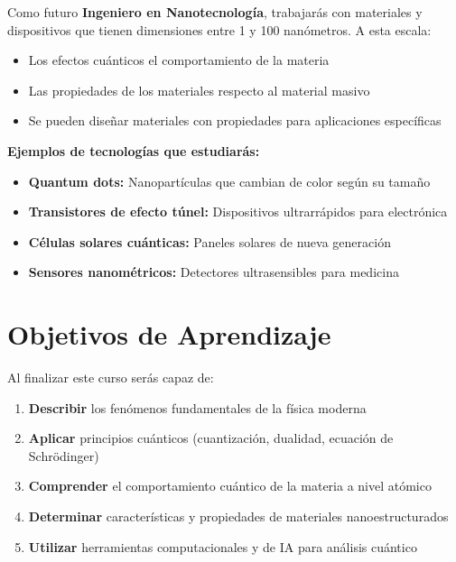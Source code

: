 \begin{tecnologiabox}
\begin{tecnologiabox}
\begin{tecnologiabox}
\begin{teknologiabox}
\begin{tecnologiabox}
\begin{tecnologiabox}
\begin{tecnologiabox}
Como futuro \textbf{Ingeniero en Nanotecnología}, trabajarás con materiales y dispositivos que tienen dimensiones entre 1 y 100 nanómetros. A esta escala:

\begin{itemize}
\item Los efectos cuánticos  el comportamiento de la materia
\item Las propiedades de los materiales  respecto al material masivo
\item Se pueden diseñar materiales con propiedades  para aplicaciones específicas
\end{itemize}

\begin{tecnologiabox}
\textbf{Ejemplos de tecnologías que estudiarás:}
\begin{itemize}
	\item \textbf{Quantum dots:} Nanopartículas que cambian de color según su tamaño
	\item \textbf{Transistores de efecto túnel:} Dispositivos ultrarrápidos para electrónica
	\item \textbf{Células solares cuánticas:} Paneles solares de nueva generación
	\item \textbf{Sensores nanométricos:} Detectores ultrasensibles para medicina
\end{itemize}
\end{tecnologiabox}

\section{Objetivos de Aprendizaje}

\begin{objetivobox}
Al finalizar este curso serás capaz de:

\begin{enumerate}
	\item \textbf{Describir} los fenómenos fundamentales de la física moderna
	\item \textbf{Aplicar} principios cuánticos (cuantización, dualidad, ecuación de Schrödinger)
	\item \textbf{Comprender} el comportamiento cuántico de la materia a nivel atómico
	\item \textbf{Determinar} características y propiedades de materiales nanoestructurados
	\item \textbf{Utilizar} herramientas computacionales y de IA para análisis cuántico
\end{enumerate}
\end{objetivobox}


\end{tecnologiabox}
\end{tecnologiabox}
\end{tecnologiabox}
\end{teknologiabox}
\end{tecnologiabox}
\end{tecnologiabox}
\end{tecnologiabox}
